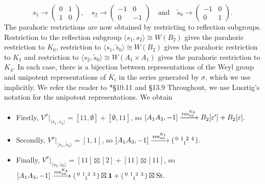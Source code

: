 \begin{example}
\begin{equation*}
        s_1\longrightarrow\begin{pmatrix}
            0 & 1 \\
            1 & 0
        \end{pmatrix},\quad s_2\longrightarrow\begin{pmatrix}
            -1 & 0 \\
            0 & -1
        \end{pmatrix}\quad\text{and}\quad \tilde{s}_0\longrightarrow\begin{pmatrix}
            -1 & 0 \\
            0 & 1
        \end{pmatrix}.
    \end{equation*}
    The parahoric restrictions are now obtained by restricting to reflection subgroups. Restriction to the reflection subgroup $\langle s_1,s_2\rangle\cong W(B_2)$ gives the parahoric restriction to $K_0$, restriction to $\langle s_1,\tilde{s}_0\rangle\cong W(B_2)$ gives the parahoric restriction to $K_1$ and restriction to $\langle s_2,\tilde{s}_0\rangle\cong W(A_1\times A_1)$ gives the parahoric restriction to $K_4$. In each case, there is a bijection between representations of the Weyl group and unipotent representations of $\overline{K}_i$ in the series generated by $\sigma$, which we use implicitly. We refer the reader to \cite{Carter1985}*{\S10.11 and \S13.9} Throughout, we use Lusztig's notation for the unipotent representations. We obtain
    \begin{itemize}
        \item Firstly, $V^\sigma|_{\langle s_1,s_2\rangle}=[11,\emptyset]+[\emptyset,11]$, so $[A_1A_3,-1]\xrightarrow{\mathrm{res}^{K_0}_{\mathrm{un}}}B_2[\varepsilon']+B_2[\varepsilon].$
        \item Secondly, $V^\sigma|_{\langle s_1,\tilde{s}_0\rangle}=[1,1]$, so $[A_1A_3,-1]\xrightarrow{\mathrm{res}^{K_1}_{\mathrm{un}}}\begin{psmallmatrix}
            0 \ 1\ 2\ 4\\
            \ \ \ 1 \ \ \
        \end{psmallmatrix}$.
        \item Finally, $V^\sigma|_{\langle s_2,\tilde{s}_0\rangle}=[11]\boxtimes[2]+[11]\boxtimes[11]$, so $[A_1A_3,-1]\xrightarrow{\mathrm{res}^{K_4}_{\mathrm{un}}}\begin{psmallmatrix}
            0 \ 1\ 2\ 3\\
            \ \ \ 1 \ \ \
        \end{psmallmatrix}\boxtimes\mathbf{1}+\begin{psmallmatrix}
            0 \ 1\ 2\ 3\\
            \ \ \ 1 \ \ \
        \end{psmallmatrix}\boxtimes\mathrm{St}.$
    \end{itemize}
\end{example}


